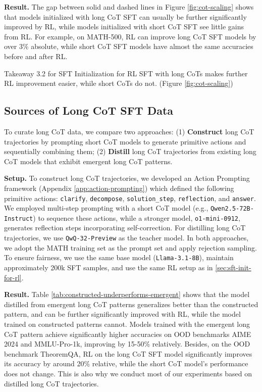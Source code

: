 \noindent\textbf{Result.} The gap between solid and dashed lines in Figure \ref{fig:cot-scaling} shows that models initialized with long CoT SFT can usually be further significantly improved by RL, while models initialized with short CoT SFT see little gains from RL. For example, on MATH-500, RL can improve long CoT SFT models by over 3\% absolute, while short CoT SFT models have almost the same accuracies before and after RL.

\begin{AIbox}{Takeaway 3.2 for SFT Initialization for RL}
SFT with long CoTs makes further RL improvement easier, while short CoTs do not. (Figure \ref{fig:cot-scaling})
\end{AIbox}

\subsection{Sources of Long CoT SFT Data}\label{sec:long-cot-pattern}

To curate long CoT data, we compare two approaches: (1) \textbf{Construct} long CoT trajectories by prompting short CoT models to generate primitive actions and sequentially combining them; (2) \textbf{Distill} long CoT trajectories from existing long CoT models that exhibit emergent long CoT patterns.

\noindent\textbf{Setup.} To construct long CoT trajectories, we developed an Action Prompting framework (Appendix \ref{app:action-prompting}) which defined the following primitive actions: \texttt{clarify}, \texttt{decompose}, \texttt{solution\_step}, \texttt{reflection}, and \texttt{answer}. We employed multi-step prompting with a short CoT model (e.g., \texttt{Qwen2.5-72B-Instruct}) to sequence these actions, while a stronger model, \texttt{o1-mini-0912}, generates reflection steps incorporating self-correction. For distilling long CoT trajectories, we use \texttt{QwQ-32-Preview} as the teacher model. In both approaches, we adopt the MATH training set as the prompt set and apply rejection sampling. To ensure fairness, we use the same base model (\texttt{Llama-3.1-8B}), maintain approximately 200k SFT samples, and use the same RL setup as in \textsection\ref{sec:sft-init-for-rl}.

\noindent\textbf{Result.} Table \ref{tab:constructed-underperforms-emergent} shows that the model distilled from emergent long CoT patterns generalizes better than the constructed pattern, and can be further significantly improved with RL, while the model trained on constructed patterns cannot. Models trained with the emergent long CoT pattern achieve significantly higher accuracies on OOD benchmarks AIME 2024 and MMLU-Pro-1k, improving by 15-50\% relatively. 
Besides, on the OOD benchmark TheoremQA, RL on the long CoT SFT model significantly improves its accuracy by around 20\% relative, while the short CoT model's performance does not change. 
This is also why we conduct most of our experiments based on distilled long CoT trajectories.

